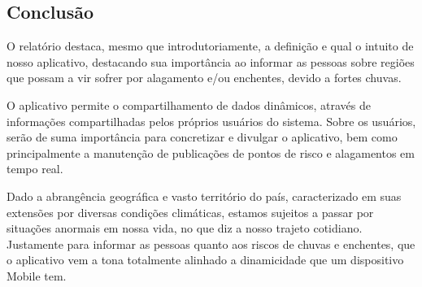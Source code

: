\documentclass[12pt]{article}
\begin{document}
\subsection{Conclusão}
O relatório destaca, mesmo que introdutoriamente, a definição e qual o intuito de nosso aplicativo, destacando sua importância ao informar as pessoas sobre regiões que possam a vir sofrer por alagamento e/ou enchentes, devido a fortes chuvas.

O aplicativo permite o compartilhamento de dados dinâmicos, através de informações compartilhadas pelos próprios usuários do sistema. Sobre os usuários, serão de suma importância para concretizar e divulgar o aplicativo, bem como principalmente a manutenção de publicações de pontos de risco e alagamentos em tempo real.

Dado a abrangência geográfica e vasto território do país, caracterizado em suas extensões por diversas condições climáticas, estamos sujeitos a passar por situações anormais em nossa vida, no que diz a nosso trajeto cotidiano. Justamente para informar as pessoas quanto aos riscos de chuvas e enchentes, que o aplicativo vem a tona totalmente alinhado a dinamicidade que um dispositivo Mobile tem.
\nocite{*}


\end{document}
